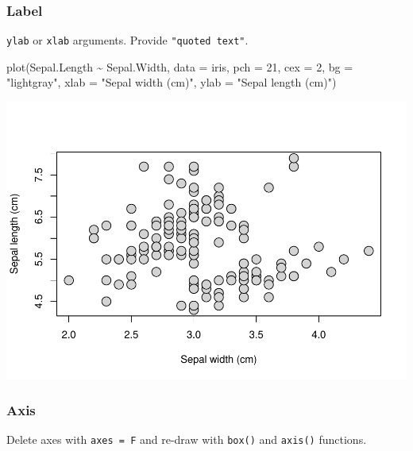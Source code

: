 \documentclass[
]{article}
\newenvironment{Shaded}{\begin{snugshade}}{\end{snugshade}}
\newcommand{\AttributeTok}[1]{\textcolor[rgb]{0.77,0.63,0.00}{#1}}
\newcommand{\DecValTok}[1]{\textcolor[rgb]{0.00,0.00,0.81}{#1}}
\newcommand{\FunctionTok}[1]{\textcolor[rgb]{0.00,0.00,0.00}{#1}}
\newcommand{\NormalTok}[1]{#1}
\newcommand{\SpecialCharTok}[1]{\textcolor[rgb]{0.00,0.00,0.00}{#1}}
\newcommand{\StringTok}[1]{\textcolor[rgb]{0.31,0.60,0.02}{#1}}
\begin{document}
\hypertarget{label}{%
\subsubsection{Label}\label{label}}

\texttt{ylab} or \texttt{xlab} arguments. Provide \texttt{"quoted\ text"}.

\begin{Shaded}
\begin{Highlighting}[]
\FunctionTok{plot}\NormalTok{(Sepal.Length }\SpecialCharTok{\textasciitilde{}}\NormalTok{ Sepal.Width, }\AttributeTok{data =}\NormalTok{ iris,}
     \AttributeTok{pch =} \DecValTok{21}\NormalTok{, }\AttributeTok{cex =} \DecValTok{2}\NormalTok{, }\AttributeTok{bg =} \StringTok{"lightgray"}\NormalTok{,}
     \AttributeTok{xlab =} \StringTok{"Sepal width (cm)"}\NormalTok{, }\AttributeTok{ylab =} \StringTok{"Sepal length (cm)"}\NormalTok{)}
\end{Highlighting}
\end{Shaded}

\begin{center}\includegraphics{biostats_files/figure-latex/unnamed-chunk-128-1} \end{center}

\hypertarget{axis}{%
\subsubsection{Axis}\label{axis}}

Delete axes with \texttt{axes\ =\ F} and re-draw with \texttt{box()} and \texttt{axis()} functions.
\end{document}
